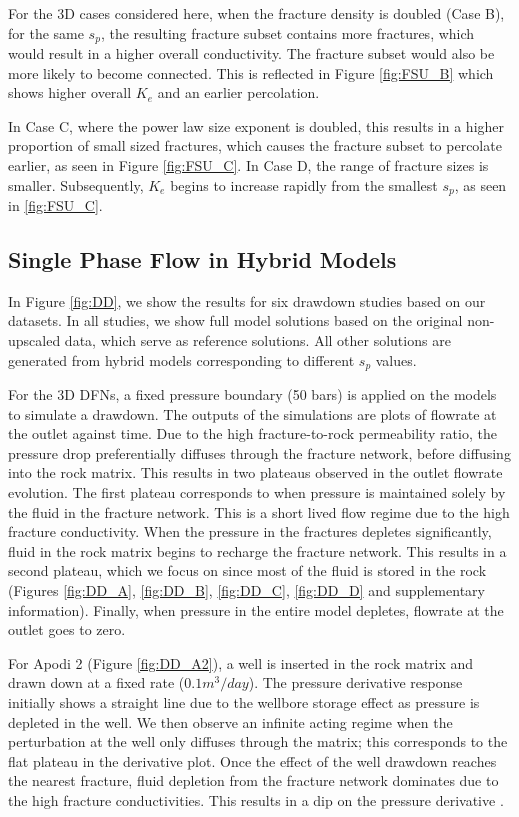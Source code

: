 \documentclass[a4paper]{article}
\begin{document}
For the 3D cases considered here, when the fracture density is doubled (Case B), for the same $s_p$, the resulting fracture subset contains more fractures, which would result in a higher overall conductivity. The fracture subset would also be more likely to become connected. This is reflected in Figure \ref{fig:FSU_B} which shows higher overall $K_e$ and an earlier percolation.

In Case C, where the power law size exponent is doubled, this results in a higher proportion of small sized fractures, which causes the fracture subset to percolate earlier, as seen in Figure \ref{fig:FSU_C}. In Case D, the range of fracture sizes is smaller. Subsequently, $K_e$ begins to increase rapidly from the smallest $s_p$, as seen in \ref{fig:FSU_C}.



\subsection{Single Phase Flow in Hybrid Models}
In Figure \ref{fig:DD}, we show the results for six drawdown studies based on our datasets. In all studies, we show full model solutions based on the original non-upscaled data, which serve as reference solutions. All other solutions are generated from hybrid models corresponding to different $s_p$ values. 

For the 3D DFNs, a fixed pressure boundary (50 bars) is applied on the models to simulate a drawdown. The outputs of the simulations are plots of flowrate at the outlet against time. Due to the high fracture-to-rock permeability ratio, the pressure drop preferentially diffuses through the fracture network, before diffusing into the rock matrix. This results in two plateaus observed in the outlet flowrate evolution. The first plateau corresponds to when pressure is maintained solely by the fluid in the fracture network. This is a short lived flow regime due to the high fracture conductivity. When the pressure in the fractures depletes significantly, fluid in the rock matrix begins to recharge the fracture network. This results in a second plateau, which we focus on since most of the fluid is stored in the rock (Figures \ref{fig:DD_A}, \ref{fig:DD_B}, \ref{fig:DD_C},  \ref{fig:DD_D} and supplementary information). Finally, when pressure in the entire model depletes, flowrate at the outlet goes to zero.

For Apodi 2 (Figure \ref{fig:DD_A2}), a well is inserted in the rock matrix and drawn down at a fixed rate ($0.1m^3/day$). The pressure derivative response initially shows a straight line due to the wellbore storage effect as pressure is depleted in the well. We then observe an infinite acting regime when the perturbation at the well only diffuses through the matrix; this corresponds to the flat plateau in the derivative plot. Once the effect of the well drawdown reaches the nearest fracture, fluid depletion from the fracture network dominates due to the high fracture conductivities. This results in a dip on the pressure derivative \citep{Bourdet1989, Cinco-Ley1976, Egya2018}.
\end{document}
